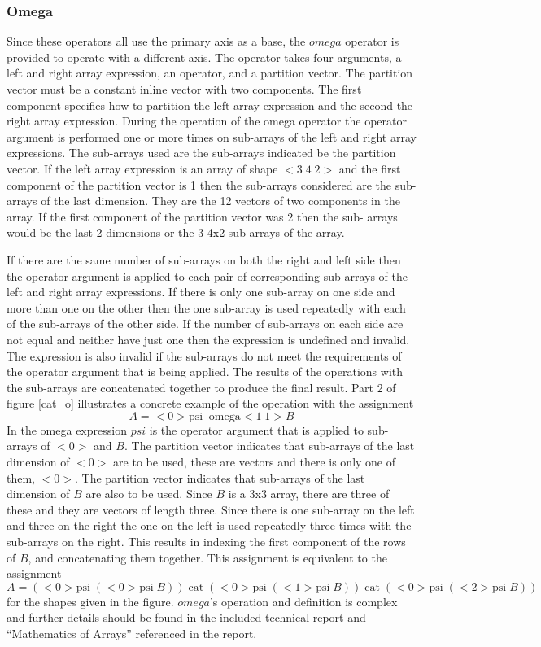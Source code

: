 \subsubsection{Omega}
Since these operators all use the primary axis as a base, the $omega$
operator is provided to operate with a different axis.  The operator takes
four arguments, a left and right array expression, an operator, and a
partition vector.  The partition vector must be a constant inline vector
with two components.  The first component specifies how to partition the 
left array expression and the second the right array expression.  During
the operation of the omega operator the operator argument is performed one
or more times on sub-arrays of the left and right array expressions.  The
sub-arrays used are the sub-arrays indicated be the partition vector.  
If the left array expression is an array of shape $<3\;4\;2>$ and the first 
component of the partition vector is 1 then the sub-arrays considered are the 
sub-arrays of the last dimension.  They are the 12 vectors of two components in
the array.  If the first component of the partition vector was 2 then the sub-
arrays would be the last 2 dimensions or the 3 4x2 sub-arrays of the array.  

If there
are the same number of sub-arrays on both the right and left side then the
operator argument is applied to each pair of corresponding sub-arrays of the
left and right array expressions.  If there is only one sub-array on one
side and more than one on the other then the one sub-array is used repeatedly
with each of the sub-arrays of the other side.  If the number of sub-arrays
on each side are not equal and neither have just one then the expression is 
undefined and invalid.  The expression is also invalid if the sub-arrays
do not meet the requirements of the operator argument that is being applied.
The results of the operations with the sub-arrays are concatenated together
to produce the final result.
Part 2 of figure \ref{cat_o} illustrates a concrete example of the operation 
with the assignment
$$A=<0> \mbox{psi}\;\;\mbox{omega} <1\;1> B$$
In the omega expression $psi$ is the operator argument that is applied to
sub-arrays of $<0>$ and $B$.  The partition vector indicates that sub-arrays of
the last dimension of $<0>$ are to be used, these are vectors and there is only
one of them, $<0>$.  The partition vector indicates that sub-arrays of the last
dimension of $B$ are also to be used.  Since $B$ is a 3x3 array, there are
three of these and they are vectors of length three.  Since there is one 
sub-array on
the left and three on the right the one on the left is used repeatedly three
times with the sub-arrays on the right.  This results in indexing the
first component of the rows of $B$, and concatenating them together.  This
assignment is equivalent to the assignment
$$A=(<0> \mbox{psi}\;(<0> \mbox{psi}\;B))\;\mbox{cat}\;
(<0> \mbox{psi}\;(<1> \mbox{psi}\;B))\;\mbox{cat}\;
(<0> \mbox{psi}\;(<2> \mbox{psi}\;B))$$
for the shapes given in the figure.
$omega$'s operation and definition is complex and further details should
be found in the included technical report and ``Mathematics of Arrays''
referenced in the report.

